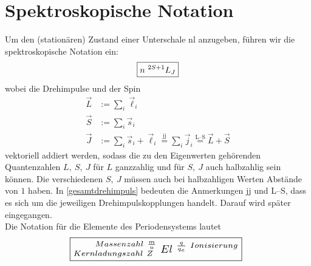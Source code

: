 \documentclass[Ex4_Zusammenfassung.tex]{subfiles}
\begin{document}
\section{Spektroskopische Notation}
Um den (stationären) Zustand einer Unterschale nl anzugeben, führen wir die spektroskopische Notation ein: 
\begin{equation}
\centering \boxed{ n \ ^{2S+1}L_J }
\end{equation}
wobei die Drehimpulse und der Spin
\begin{align}
	\vec L &:= \sum_{i} \vec{\ell}_i \\
	\vec S &:= \sum_{i} \vec{s}_i \\
	\vec J &:= \sum_{i} \vec{s}_i + \vec{\ell}_i \stackrel{\text{jj}}{=} \sum_i \vec{j}_i \stackrel{\text{L--S}}{=} \vec{L} + \vec{S} \label{gesamtdrehimpuls}
\end{align}
vektoriell addiert werden, sodass die zu den Eigenwerten gehörenden Quantenzahlen $L,\ S,\ J$ für $L$ ganzzahlig und für $S,\ J$ auch halbzahlig sein können. Die verschiedenen $S,\ J$ müssen auch bei halbzahligen Werten Abstände von $1$ haben. In \ref{gesamtdrehimpuls} bedeuten die Anmerkungen jj und L--S, dass es sich um die jeweiligen Drehimpulskopplungen handelt. Darauf wird später eingegangen.\\

Die Notation für die Elemente des Periodensystems lautet
\begin{equation}
	\resizebox{0.6\hsize}{!}{%
	$\centering \boxed{^{\qquad Massenzahl \  \frac{m}{u} } _{Kernladungszahl \  Z} \  El ^{\ \frac{q}{q_e} \  Ionisierung}} $
	}
\end{equation}
\end{document}
